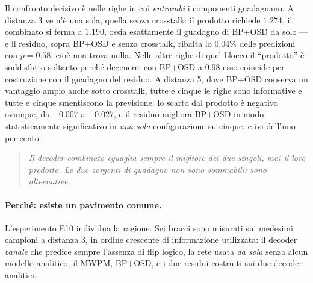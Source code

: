 Il confronto decisivo è nelle righe in cui \emph{entrambi} i componenti guadagnano. A distanza 3 ve n'è una sola, quella senza crosstalk: il prodotto richiede $1.274$, il combinato si ferma a $1.190$, ossia esattamente il guadagno di BP+OSD da solo --- e il residuo, sopra BP+OSD e senza crosstalk, ribalta lo $0.04\%$ delle predizioni con $p = 0.58$, cioè non trova nulla. Nelle altre righe di quel blocco il ``prodotto'' è soddisfatto soltanto perché degenere: con BP+OSD a $0.98$ esso coincide per costruzione con il guadagno del residuo. A distanza 5, dove BP+OSD conserva un vantaggio ampio anche sotto crosstalk, tutte e cinque le righe sono informative e tutte e cinque smentiscono la previsione: lo scarto dal prodotto è negativo ovunque, da $-0.007$ a $-0.027$, e il residuo migliora BP+OSD in modo statisticamente significativo in \emph{una sola} configurazione su cinque, e ivi dell'uno per cento.

\begin{quote}
\emph{Il decoder combinato eguaglia sempre il migliore dei due singoli, mai il loro prodotto. Le due sorgenti di guadagno non sono sommabili: sono alternative.}
\end{quote}

\paragraph{Perché: esiste un pavimento comune.}
L'esperimento E10 individua la ragione. Sei bracci sono misurati sui medesimi campioni a distanza 3, in ordine crescente di informazione utilizzata: il decoder \emph{banale} che predice sempre l'assenza di flip logico, la rete usata \emph{da sola} senza alcun modello analitico, il \ac{MWPM}, BP+OSD, e i due residui costruiti sui due decoder analitici.

